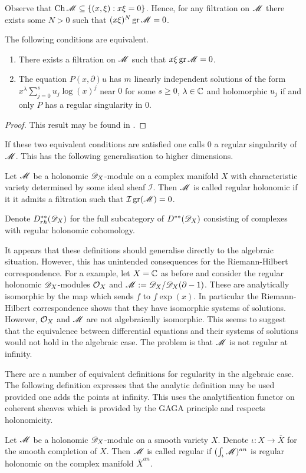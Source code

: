 Observe that $\operatorname{Ch} \mathscr{M}\subseteq \{(x,\xi): x\xi = 0\}$.
Hence, for any filtration on $\mathscr{M}$ there exists some $N>0$ such that
$(x\xi)^N \operatorname{gr}\mathscr{M} = 0 $.
\begin{proposition}
  The following conditions are equivalent.
  \begin{enumerate}
    \item There exists a filtration on $\mathscr{M}$ such that $x\xi\operatorname{gr}\mathscr{M} = 0$.
    \item The equation $P(x,\partial)u$ has $m$ linearly independent solutions of the form $x^\lambda \sum_{j=0}^s u_j \log(x)^j $
    near $0$ for some $s\geq 0$, $\lambda \in \mathbb{C}$ and holomorphic $u_j$ if and only $P$ has a regular singularity in $0$.
  \end{enumerate}
\end{proposition}
\begin{proof}
  This result may be found in \cite[Chapter 5]{kashiwara2003d}.
\end{proof}
If these two equivalent conditions are satisfied one calls $0$ a regular singularity of $\mathscr{M}$.
This has the following generalisation to higher dimensions.
\begin{definition}
   Let $\mathscr{M}$ be a holonomic $\mathscr{D}_X$-module on a complex manifold $X$ with characteristic variety determined by some ideal sheaf $\mathcal{I}$. Then $\mathscr{M}$ is called regular holonomic if it it admits a filtration such that $\mathcal{I} \operatorname{gr}(\mathscr{M}) = 0$.
\end{definition}
Denote $D^{**}_{rh}(\mathscr{D}_X)$ for the full subcategory of $D^{**}(\mathscr{D}_X)$ consisting of complexes with regular holonomic cohomology.

It appears that these definitions should generalise directly to the algebraic situation.
However, this has unintended consequences for the Riemann-Hilbert correspondence.
For a example, let $X = \mathbb{C}$ as before and consider the regular holonomic $\mathscr{D}_X$-modules $\mathcal{O}_X$ and $\mathscr{M} := \mathscr{D}_X/\mathscr{D}_X(\partial - 1)$.
These are analytically isomorphic by the map which sends $f$ to $f\exp(x)$.
In particular the Riemann-Hilbert correspondence shows that they have isomorphic systems of solutions.
However, $\mathcal{O}_X$ and $\mathscr{M}$ are not algebraically isomorphic.
This seems to suggest that the equivalence between differential equations and their systems of solutions would not hold in the algebraic case.
The problem is that $\mathscr{M}$ is not regular at infinity.

There are a number of equivalent definitions for regularity in the algebraic case.
The following definition expresses that the analytic definition may be used provided one adds the points at infinity.
This uses the analytification functor on coherent sheaves which is provided by the GAGA principle and respects holonomicity.
\begin{definition}
  Let $\mathscr{M}$ be a holonomic $\mathscr{D}_X$-module on a smooth variety $X$. Denote $\iota:X \to \overline{X}$ for the smooth completion of $X$. Then $\mathscr{M}$ is called regular if $(\int_\iota \mathscr{M})^{an}$ is regular holonomic on the complex manifold $\overline{X}^{an}$.
\end{definition}
